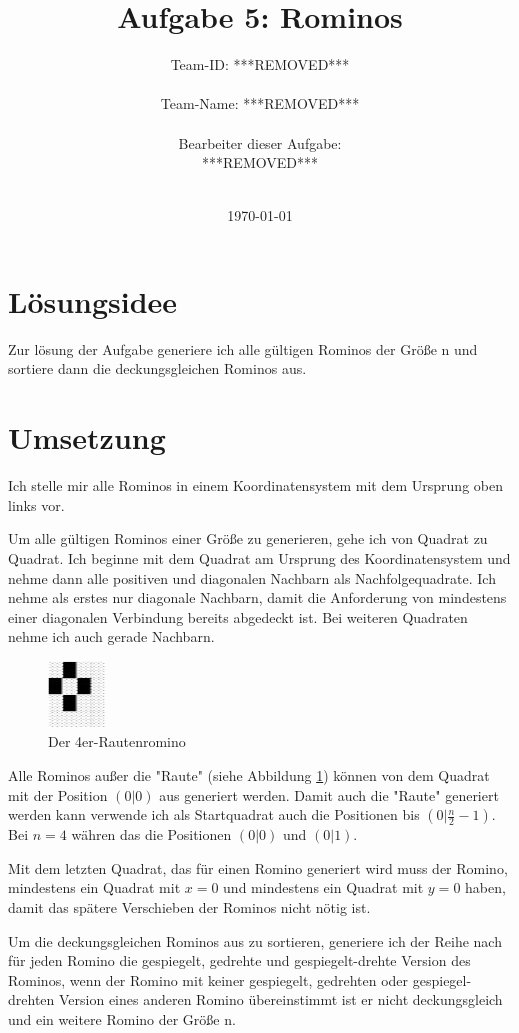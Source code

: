 \documentclass[a4paper,10pt]{scrartcl}
\title{Aufgabe 5: Rominos}
\author{Team-ID: ***REMOVED*** \\\\
	    Team-Name: ***REMOVED*** \\\\
	    Bearbeiter dieser Aufgabe: \\
	    ***REMOVED***\\\\}
\date{\today}
\begin{document}
\maketitle
\tableofcontents

\section{Lösungsidee}
Zur lösung der Aufgabe generiere ich alle gültigen Rominos der Größe n und sortiere dann die deckungsgleichen Rominos aus.

\section{Umsetzung}
Ich stelle mir alle Rominos in einem Koordinatensystem mit dem Ursprung oben links vor.

Um alle gültigen Rominos einer Größe zu generieren, gehe ich von Quadrat zu Quadrat. Ich beginne mit dem Quadrat am Ursprung des Koordinatensystem und nehme dann alle positiven und diagonalen Nachbarn als Nachfolgequadrate. Ich nehme als erstes nur diagonale Nachbarn, damit die Anforderung von mindestens einer diagonalen Verbindung bereits abgedeckt ist. Bei weiteren Quadraten nehme ich auch gerade Nachbarn.

\begin{figure}[h]
  \centering
  \includegraphics{raute.jpg}
  \caption{Der 4er-Rautenromino}
  \label{fig:raute}
\end{figure}

Alle Rominos außer die "Raute" (siehe Abbildung \ref{fig:raute}) können von dem Quadrat mit der Position \((0|0)\) aus generiert werden. Damit auch die "Raute" generiert werden kann verwende ich als Startquadrat auch die Positionen bis \((0|\frac{n}{2}-1)\). Bei \(n=4\) währen das die Positionen \((0|0)\) und \((0|1)\).

Mit dem letzten Quadrat, das für einen Romino generiert wird muss der Romino, mindestens ein Quadrat mit \(x=0\) und mindestens ein Quadrat mit \(y=0\) haben, damit das spätere Verschieben der Rominos nicht nötig ist.

Um die deckungsgleichen Rominos aus zu sortieren, generiere ich der Reihe nach für jeden Romino die gespiegelt, gedrehte und gespiegelt-drehte Version des Rominos, wenn der Romino mit keiner gespiegelt, gedrehten oder gespiegel-drehten Version eines anderen Romino übereinstimmt ist er nicht deckungsgleich und ein weitere Romino der Größe n.
\end{document}
